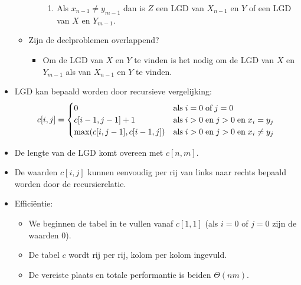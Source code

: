 \begin{itemize}
\begin{itemize}
\begin{itemize}
\begin{enumerate}
                \item Als $x_{n - 1} \neq y_{m - 1}$ dan is $Z$ een LGD van $X_{n - 1}$ en $Y$ of een LGD van $X$ en $Y_{m - 1}$.
            \end{enumerate}
        \end{itemize}
        \item Zijn de deelproblemen overlappend?
        \begin{itemize}
            \item Om de LGD van $X$ en $Y$ te vinden is het nodig om de LGD van $X$ en $Y_{m - 1}$ als van $X_{n - 1}$ en $Y$ te vinden.
        \end{itemize}
    \end{itemize}
    \item LGD kan bepaald worden door recursieve vergelijking:
    $$c[i, j] = \begin{cases}
        0 & \hbox{als}\; i = 0\;\hbox{of}\; j = 0 \\
        c[i - 1, j - 1] + 1 & \hbox{als}\; i >0\;\hbox{en}\; j > 0\;\hbox{en}\; x_i = y_j\\
        \max(c[i, j- 1], c[i - 1, j]) & \hbox{als}\; i >0\;\hbox{en}\; j > 0\;\hbox{en}\; x_i \neq y_j\\
    \end{cases}$$
    \item De lengte van de LGD komt overeen met $c[n, m]$.
    \item De waarden $c[i, j]$ kunnen eenvoudig per rij van links naar rechts bepaald worden door de recursierelatie.
    \item Efficiëntie:
    \begin{itemize}
        \item We beginnen de tabel in te vullen vanaf $c[1, 1]$ (als $i = 0$ of $j = 0$ zijn de waarden 0).
        \item De tabel $c$ wordt rij per rij, kolom per kolom ingevuld.
        \item De vereiste plaats en totale performantie is beiden $\Theta(nm)$.
    \end{itemize}

\end{itemize}
